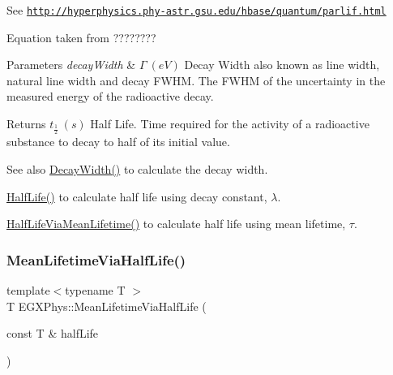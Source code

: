 See \href{http://hyperphysics.phy-astr.gsu.edu/hbase/quantum/parlif.html}{\tt http\+://hyperphysics.\+phy-\/astr.\+gsu.\+edu/hbase/quantum/parlif.\+html}

Equation taken from ????????


\begin{DoxyParams}{Parameters}
{\em decay\+Width} & $\Gamma\ (eV)$ Decay Width also known as line width, natural line width and decay F\+W\+HM. The F\+W\+HM of the uncertainty in the measured energy of the radioactive decay. \\
\hline
\end{DoxyParams}
\begin{DoxyReturn}{Returns}
$t_{\frac{1}{2}}\ (s)$ Half Life. Time required for the activity of a radioactive substance to decay to half of its initial value. 
\end{DoxyReturn}
\begin{DoxySeeAlso}{See also}
\hyperlink{group___e_g_x_phys-_decay_width_gae232ec8bb39710131be898c057a25620}{Decay\+Width()} to calculate the decay width. 

\hyperlink{group___e_g_x_phys-_half_life_ga21d268f154fb91c1c556bbfa7fe83ac1}{Half\+Life()} to calculate half life using decay constant, $\lambda$. 

\hyperlink{group___e_g_x_phys-_half_life_gacddef16b62e98b214ec8dd8af7da7dce}{Half\+Life\+Via\+Mean\+Lifetime()} to calculate half life using mean lifetime, $\tau$. 
\end{DoxySeeAlso}
\mbox{\label{group___e_g_x_phys-_mean_lifetime_ga2586e148263e1f6c8ff89f269a0930ea}} 
\subsubsection{\texorpdfstring{Mean\+Lifetime\+Via\+Half\+Life()}{MeanLifetimeViaHalfLife()}}
{\footnotesize\ttfamily template$<$typename T $>$ \\
T E\+G\+X\+Phys\+::\+Mean\+Lifetime\+Via\+Half\+Life (\begin{DoxyParamCaption}\item[{const T \&}]{half\+Life }\end{DoxyParamCaption})}



